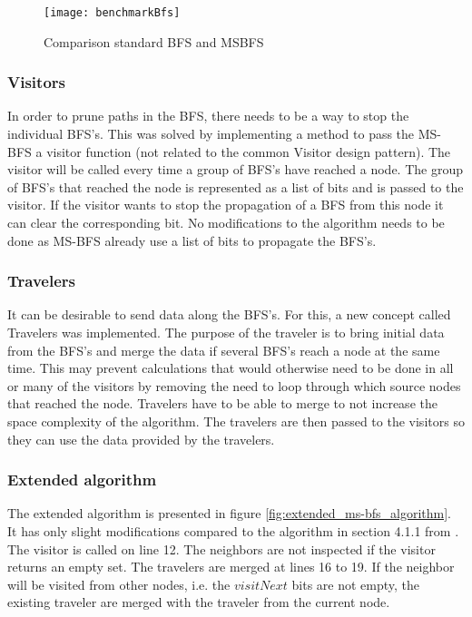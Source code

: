 \begin{figure}[h]
\centering
\texttt{[image: benchmarkBfs]}    
\captionsetup{justification=centering}
\caption {Comparison standard BFS and MSBFS}
\label{fig:benchmarkbfs}
\end{figure}

\subsubsection{Visitors}
In order to prune paths in the BFS, there needs to be a way to stop the individual BFS's. This was solved by implementing a method to pass the MS-BFS a visitor function (not related to the common Visitor design pattern). The visitor will be called every time a group of BFS's have reached a node. The group of BFS's that reached the node is represented as a list of bits and is passed to the visitor. If the visitor wants to stop the propagation of a BFS from this node it can clear the corresponding bit. No modifications to the algorithm needs to be done as MS-BFS already use a list of bits to propagate the BFS's.

\subsubsection{Travelers}
It can be desirable to send data along the BFS's. For this, a new concept called Travelers was implemented. The purpose of the traveler is to bring initial data from the BFS's and merge the data if several BFS's reach a node at the same time. This may prevent calculations that would otherwise need to be done in all or many of the visitors by removing the need to loop through which source nodes that reached the node. Travelers have to be able to merge to not increase the space complexity of the algorithm. The travelers are then passed to the visitors so they can use the data provided by the travelers. 

\subsubsection{Extended algorithm}

The extended algorithm is presented in figure \ref{fig:extended_ms-bfs_algorithm}. It has only slight modifications compared to the algorithm in section 4.1.1 from \cite{msbfs}. The visitor is called on line 12. The neighbors are not inspected if the visitor returns an empty set. The travelers are merged at lines 16 to 19. If the neighbor will be visited from other nodes, i.e. the $visitNext$ bits are not empty, the existing traveler are merged with the traveler from the current node.

